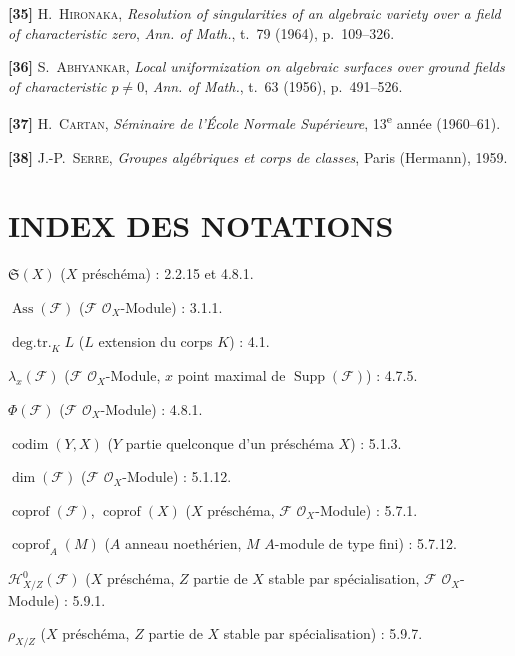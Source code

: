 \documentclass[10pt,oneside]{book}
\newcommand{\oldpage}[2][]{%
  \setcounter{footnote}{0}%
  \marginpar{\scriptsize\textbf{#1}~|~#2}\ignorespaces}
\begin{document}
\textbf{[35]} H.~\textsc{Hironaka}, \emph{Resolution of singularities of an
algebraic variety over a field of characteristic zero}, \emph{Ann. of Math.},
t.~79 (1964), p.~109--326.

\textbf{[36]} S.~\textsc{Abhyankar}, \emph{Local uniformization on algebraic
surfaces over ground fields of characteristic $p\ne0$}, \emph{Ann. of
Math.}, t.~63 (1956), p.~491--526.

\textbf{[37]} H.~\textsc{Cartan}, \emph{Séminaire de l'École Normale
Supérieure}, 13\textsuperscript{e} année (1960--61).

\textbf{[38]} J.-P.~\textsc{Serre}, \emph{Groupes algébriques et corps de
classes}, Paris (Hermann), 1959.

\endgroup

\clearpage
\oldpage[IV-2]{225}
{}
\section*{INDEX DES NOTATIONS}

\begingroup
\small
\setlength{\parindent}{0pt}
\setlength{\parskip}{2pt}

$\mathfrak S(X)$ ($X$ préschéma) : 2.2.15 et 4.8.1.

$\operatorname{Ass}(\mathscr F)$ ($\mathscr F$ $\mathcal O_X$-Module) : 3.1.1.

$\operatorname{deg.tr.}_K L$ ($L$ extension du corps $K$) : 4.1.

$\lambda_x(\mathscr F)$ ($\mathscr F$ $\mathcal O_X$-Module, $x$ point maximal
de $\operatorname{Supp}(\mathscr F)$) : 4.7.5.

$\Phi(\mathscr F)$ ($\mathscr F$ $\mathcal O_X$-Module) : 4.8.1.

$\operatorname{codim}(Y,X)$ ($Y$ partie quelconque d'un préschéma $X$) : 5.1.3.

$\dim(\mathscr F)$ ($\mathscr F$ $\mathcal O_X$-Module) : 5.1.12.

$\operatorname{coprof}(\mathscr F)$, $\operatorname{coprof}(X)$ ($X$
préschéma, $\mathscr F$ $\mathcal O_X$-Module) : 5.7.1.

$\operatorname{coprof}_A(M)$ ($A$ anneau noethérien, $M$ $A$-module de type
fini) : 5.7.12.

$\mathcal H^0_{X/Z}(\mathscr F)$ ($X$ préschéma, $Z$ partie de $X$ stable par
spécialisation, $\mathscr F$ $\mathcal O_X$-Module) : 5.9.1.

$\rho_{X/Z}$ ($X$ préschéma, $Z$ partie de $X$ stable par
spécialisation) : 5.9.7.
\end{document}
